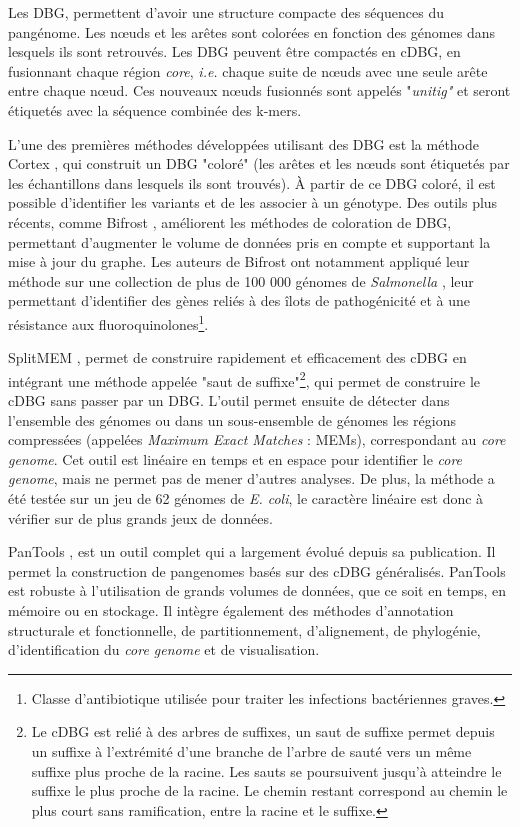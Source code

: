 Les DBG, permettent d'avoir une structure compacte des séquences du pangénome. Les n\oe uds et les arêtes sont colorées en fonction des génomes dans lesquels ils sont retrouvés. Les DBG peuvent être compactés en cDBG, en fusionnant chaque région \textit{core}, \textit{i.e.} chaque suite de n\oe uds avec une seule arête entre chaque n\oe ud. Ces nouveaux n\oe uds fusionnés sont appelés "\textit{unitig"} et seront étiquetés avec la séquence combinée des k-mers.

L'une des premières méthodes développées utilisant des DBG est la méthode Cortex \cite{iqbal_novo_2012}, qui construit un DBG "coloré" (les arêtes et les n\oe uds sont étiquetés par les échantillons dans lesquels ils sont trouvés). À partir de ce DBG coloré, il est possible d'identifier les variants et de les associer à un génotype. Des outils plus récents, comme Bifrost \cite{holley_bifrost_2020}, améliorent les méthodes de coloration de DBG, permettant d'augmenter le volume de données pris en compte et supportant la mise à jour du graphe. Les auteurs de Bifrost ont notamment appliqué leur méthode sur une collection de plus de 100 000 génomes de \textit{Salmonella} \cite{luhmann_blastfrost_2021}, leur permettant d'identifier des gènes reliés à des îlots de pathogénicité et à une résistance aux fluoroquinolones\footnote{Classe d'antibiotique utilisée pour traiter les infections bactériennes graves.}.

\newpage
SplitMEM \cite{marcus_splitmem_2014}, permet de construire rapidement et efficacement des cDBG en intégrant une méthode appelée "saut de suffixe"\footnote{Le cDBG est relié à des arbres de suffixes, un saut de suffixe permet depuis un suffixe à l'extrémité d'une branche de l'arbre de sauté vers un même suffixe plus proche de la racine. Les sauts se poursuivent jusqu'à atteindre le suffixe le plus proche de la racine. Le chemin restant correspond au chemin le plus court sans ramification, entre la racine et le suffixe.}, qui permet de construire le cDBG sans passer par un DBG. L'outil permet ensuite de détecter dans l'ensemble des génomes ou dans un sous-ensemble de génomes les régions compressées (appelées \textit{Maximum Exact Matches} : MEMs), correspondant au \textit{core genome}. Cet outil est linéaire en temps et en espace pour identifier le \textit{core genome}, mais ne permet pas de mener d'autres analyses. De plus, la méthode a été testée sur un jeu de 62 génomes de \textit{E. coli}, le caractère linéaire est donc à vérifier sur de plus grands jeux de données.

PanTools \cite{sheikhizadeh_pantools_2016}, est un outil complet qui a largement évolué depuis sa publication. Il permet la construction de pangenomes basés sur des cDBG généralisés. PanTools est robuste à l'utilisation de grands volumes de données, que ce soit en temps, en mémoire ou en stockage. Il intègre également des méthodes d'annotation structurale et fonctionnelle, de partitionnement, d'alignement, de phylogénie, d'identification du \textit{core genome} et de visualisation. 

